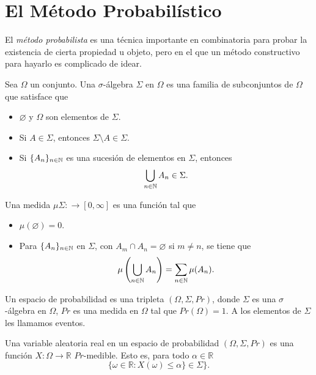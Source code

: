 \section{El Método Probabilístico}
El \textit{método probabilista} es una técnica importante en
combinatoria para probar la existencia de cierta propiedad u objeto, pero en el
que un método constructivo para hayarlo es complicado de idear.

\begin{definition}
  Sea $\Omega$ un conjunto. Una $\sigma$-álgebra $\Sigma$ en $\Omega$ es una
  familia de subconjuntos de $\Omega$ que satisface que
  \begin{itemize}
    \item $\varnothing$ y $\Omega $ son elementos de $\Sigma$.
    \item Si $A \in \Sigma$, entonces $\Sigma \setminus A \in \Sigma$.
    \item Si $\{A_n\}_{n\in \mathbb{N}}$ es una sucesión de elementos en
      $\Sigma$, entonces
      $$\bigcup_{n \in \mathbb{N}} A_n \in \Sigma.$$
  \end{itemize}
\end{definition}

\begin{definition}[medida]
  Una medida $\mu \Sigma: \rightarrow [0, \infty]$ es una función tal que
  \begin{itemize}
    \item $\mu(\varnothing) = 0$.
    \item Para $\{A_n\}_{n\in \mathbb{N}}$ en $\Sigma$, con $A_m \cap A_n =
      \varnothing$ si $m \neq n$, se tiene que
      $$ \mu\left( \bigcup_{n \in \mathbb{N}} A_n \right) = \sum_{n \in \mathbb{N}} \mu(A_n).$$
  \end{itemize}
\end{definition}

\begin{definition}
  Un espacio de probabilidad es una tripleta $(\Omega, \Sigma, Pr)$,
  donde $\Sigma$ es una $\sigma$-álgebra en $\Omega$, $Pr$ es una
  medida en $\Omega$ tal que $Pr(\Omega) = 1$. A los elementos de
  $\Sigma$ les llamamos eventos.
\end{definition}

\begin{definition}
  Una variable aleatoria real en un espacio de probabilidad $(\Omega,
  \Sigma, Pr)$ es una
  función $X: \Omega \rightarrow \mathbb R$ $Pr$-medible. Esto es,
  para todo $\alpha \in \mathbb R$
$$\{\omega \in \mathbb R: X(\omega) \le \alpha \} \in \Sigma \}.$$
\end{definition}

